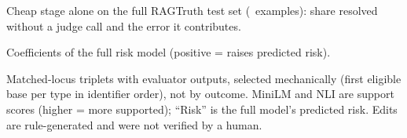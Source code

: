 \begin{table}[t]
\centering\small

\caption{Cheap stage alone on the full RAGTruth test set (\NTestRagtruth\ examples): share resolved without a judge call and the error it contributes.}
\label{tab:cheapstage}
\end{table}

\begin{table}[t]
\centering\small

\caption{Coefficients of the full risk model (positive = raises predicted risk).}
\label{tab:coef}
\end{table}

\begin{table}[t]
\centering\small
\resizebox{\textwidth}{!}{}
\caption{Matched-locus triplets with evaluator outputs, selected mechanically (first eligible base per type in identifier order), not by outcome. MiniLM and NLI are support scores (higher = more supported); ``Risk'' is the full model's predicted risk. Edits are rule-generated and were not verified by a human.}
\label{tab:examples}
\end{table}
